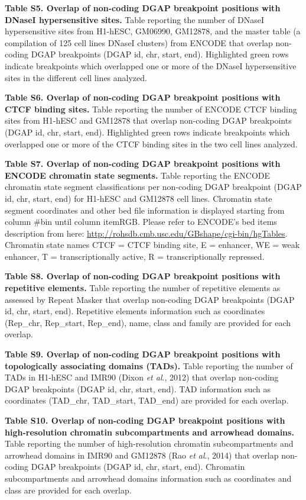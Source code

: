 \documentclass[a4paper,twoside=true,openright,parskip=full,chapterprefix=true,11pt,headings=normal,bibliography=totoc,listof=totoc,titlepage=on,captions=tableabove,draft=false]{scrreprt}
\theoremstyle{definition}
\theoremstyle{definition}
\theoremstyle{definition}
\theoremstyle{remark}
\begin{document}
\textbf{Table S5. Overlap of non-coding DGAP breakpoint positions with
DNaseI hypersensitive sites.} Table reporting the number of DNaseI
hypersensitive sites from H1-hESC, GM06990, GM12878, and the master
table (a compilation of 125 cell lines DNaseI clusters) from ENCODE that
overlap non-coding DGAP breakpoints (DGAP id, chr, start, end).
Highlighted green rows indicate breakpoints which overlapped one or more
of the DNaseI hypersensitive sites in the different cell lines analyzed.

\textbf{Table S6. Overlap of non-coding DGAP breakpoint positions with
CTCF binding sites.} Table reporting the number of ENCODE CTCF binding
sites from H1-hESC and GM12878 that overlap non-coding DGAP breakpoints
(DGAP id, chr, start, end). Highlighted green rows indicate breakpoints
which overlapped one or more of the CTCF binding sites in the two cell
lines analyzed.

\textbf{Table S7. Overlap of non-coding DGAP breakpoint positions with
ENCODE chromatin state segments.} Table reporting the ENCODE chromatin
state segment classifications per non-coding DGAP breakpoint (DGAP id,
chr, start, end) for H1-hESC and GM12878 cell lines. Chromatin state
segment coordinates and other bed file information is displayed starting
from column \#bin until column itemRGB. Please refer to ENCODE's bed
items description from here:
\url{http://rohsdb.cmb.usc.edu/GBshape/cgi-bin/hgTables}. Chromatin
state names CTCF = CTCF binding site, E = enhancer, WE = weak enhancer,
T = transcriptionally active, R = transcriptionally repressed.

\textbf{Table S8. Overlap of non-coding DGAP breakpoint positions with
repetitive elements.} Table reporting the number of repetitive elements
as assessed by Repeat Masker that overlap non-coding DGAP breakpoints
(DGAP id, chr, start, end). Repetitive elements information such as
coordinates (Rep\_chr, Rep\_start, Rep\_end), name, class and family are
provided for each overlap.

\textbf{Table S9. Overlap of non-coding DGAP breakpoint positions with
topologically associating domains (TADs).} Table reporting the number of
TADs in H1-hESC and IMR90 (Dixon \emph{et al}., 2012) that overlap
non-coding DGAP breakpoints (DGAP id, chr, start, end). TAD information
such as coordinates (TAD\_chr, TAD\_start, TAD\_end) are provided for
each overlap.

\textbf{Table S10. Overlap of non-coding DGAP breakpoint positions with
high-resolution chromatin subcompartments and arrowhead domains.} Table
reporting the number of high-resolution chromatin subcompartments and
arrowhead domains in IMR90 and GM12878 (Rao \emph{et al}., 2014) that
overlap non-coding DGAP breakpoints (DGAP id, chr, start, end).
Chromatin subcompartments and arrowhead domains information such as
coordinates and class are provided for each overlap.
\end{document}
